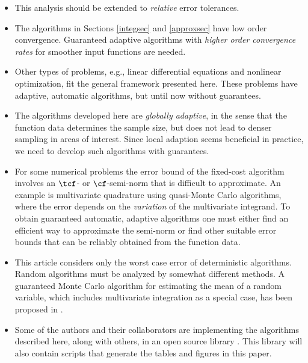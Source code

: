 \documentclass[]{elsarticle}
\theoremstyle{definition}
\theoremstyle{remark}
\begin{document}
\begin{itemize}

\item This analysis should be extended to \emph{relative} error tolerances.  

\item The algorithms in Sections \ref{integsec} and \ref{approxsec} have low order convergence.  Guaranteed adaptive algorithms with \emph{higher order convergence rates} for smoother input functions are needed.

\item Other types of problems, e.g., linear differential equations and nonlinear optimization, fit the general framework presented here.  These problems have adaptive, automatic algorithms, but until now without guarantees.

\item The algorithms developed here are \emph{globally adaptive}, in the sense that the function data determines the sample size, but does not lead to denser sampling in areas of interest.  Since local adaption seems beneficial in practice, we need to develop such algorithms with guarantees.

\item For some numerical problems the error bound of the fixed-cost algorithm involves an $\tcf$- or $\cf$-semi-norm that is difficult to approximate.  An example is multivariate quadrature using quasi-Monte Carlo algorithms, where the error depends on the \emph{variation} of the multivariate integrand.  To obtain guaranteed automatic, adaptive algorithms one must either find an efficient way to approximate the semi-norm or find other suitable error bounds that can be reliably obtained from the function data.  

\item This article considers only the worst case error of deterministic algorithms.  Random algorithms must be analyzed by somewhat different methods.  A guaranteed Monte Carlo algorithm for estimating the mean of a random variable, which includes multivariate integration as a special case, has been proposed in \cite{HicEtal14a}.

\item Some of the authors and their collaborators are implementing the algorithms described here, along with others, in an open source library \cite{ChoiEtal13a}.  This library will also contain scripts that generate the tables and figures in this paper.

\end{itemize}
\end{document}
